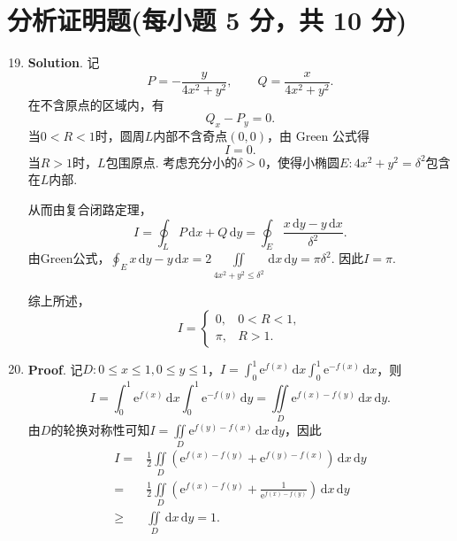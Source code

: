 \documentclass[../main.tex]{subfiles}
\begin{document}
\section{分析证明题(每小题 5 分，共 10 分)}
\begin{enumerate}
    \setcounter{enumi}{18}
    \item \textbf{Solution}. 记
          \[
              P=-\frac{y}{4x^2+y^2},\qquad Q=\frac{x}{4x^2+y^2}.
          \]
          在不含原点的区域内，有
          \[
              Q_x-P_y=0.
          \]
          当$0<R<1$时，圆周$L$内部不含奇点$(0,0)$，由 Green 公式得
          \[
              I=0.
          \]
          当$R>1$时，$L$包围原点. 考虑充分小的$\delta>0$，使得小椭圆$E:4x^2+y^2=\delta^2$包含在$L$内部.

          从而由复合闭路定理，
          \[
              I=\oint_L P\,\mathrm{d}x+Q\,\mathrm{d}y=\oint_E \frac{x\,\mathrm{d}y-y\,\mathrm{d}x}{\delta^2}.
          \]
          由Green公式，$\oint_E x\,\mathrm{d}y-y\,\mathrm{d}x=2\iint\limits_{4x^2+y^2\le\delta^2}\,\mathrm{d}x\,\mathrm{d}y=\pi\delta^2$. 因此$I=\pi$.

          综上所述，
          \[
              I=\begin{cases}
                  0,   & 0<R<1, \\
                  \pi, & R>1.
              \end{cases}
          \]

    \item \textbf{Proof}. 记$D:0\le x\le1,0\le y\le1$，$I=\int_0^1\mathrm{e}^{f(x)}\,\mathrm{d}x\int_0^1\mathrm{e}^{-f(x)}\,\mathrm{d}x$，则
          \[
              I=\int_0^1\mathrm{e}^{f(x)}\,\mathrm{d}x\int_0^1\mathrm{e}^{-f(y)}\,\mathrm{d}y
              =\iint\limits_D\mathrm{e}^{f(x)-f(y)}\,\mathrm{d}x\,\mathrm{d}y.
          \]
          由$D$的轮换对称性可知$I=\iint\limits_D\mathrm{e}^{f(y)-f(x)}\,\mathrm{d}x\,\mathrm{d}y$，因此
          \[
              \begin{aligned}
                  I={}   & \frac{1}{2}\iint\limits_D\left(\mathrm{e}^{f(x)-f(y)}+\mathrm{e}^{f(y)-f(x)}\right)\,\mathrm{d}x\,\mathrm{d}y           \\
                  ={}    & \frac{1}{2}\iint\limits_D\left(\mathrm{e}^{f(x)-f(y)}+\frac{1}{\mathrm{e}^{f(x)-f(y)}}\right)\,\mathrm{d}x\,\mathrm{d}y \\
                  \geq{} & \iint\limits_D\,\mathrm{d}x\,\mathrm{d}y=1.
              \end{aligned}
          \]

\end{enumerate}
\end{document}
